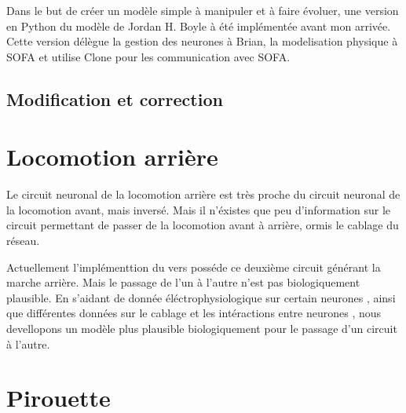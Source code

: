 Dans le but de créer un modèle simple à manipuler et à faire évoluer, une version en Python du
modèle de Jordan H. Boyle à été implémentée avant mon arrivée. Cette version délègue la gestion
des neurones à Brian, la modelisation physique à SOFA et utilise Clone pour les communication
avec SOFA.

\subsection{Modification et correction} %
\label{sub:Modification et correction}



\section{Locomotion arrière} %
\label{sec:Locomotion arrière}

Le circuit neuronal de la locomotion arrière est très proche du circuit neuronal de la locomotion
avant, mais inversé\cite{Boyle2009}. Mais il n'éxistes que peu d'information sur le circuit
permettant de passer de la locomotion avant à arrière, ormis le cablage du réseau.

Actuellement l'implémenttion du vers posséde ce deuxième circuit générant la marche arrière. Mais
le passage de l'un à l'autre n'est pas biologiquement plausible. En s'aidant de donnée
éléctrophysiologique sur certain neurones \cite{Mellem2008a,Lockery2009}, ainsi que différentes
données sur le cablage et les intéractions entre neurones
\cite{Chalfie1985,Gray2005,Chen2006,Varshney2011,Leifer2011}, nous devellopons un modèle plus
plausible biologiquement pour le passage d'un circuit à l'autre.


\section{Pirouette} %
\label{sec:Pirouette}


